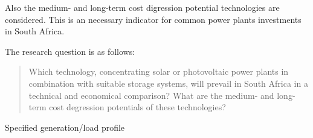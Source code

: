 Also the medium- and long-term cost digression potential technologies are considered. This is an necessary indicator for common power plants investments in South Africa.



The research question is as follows:
\begin{quote}
Which technology, concentrating solar or photovoltaic power plants in combination with suitable storage systems, will prevail in South Africa in a technical and economical comparison? What are the medium- and long-term cost degression potentials of these technologies?
\end{quote}


Specified generation/load profile 



\pagebreak

